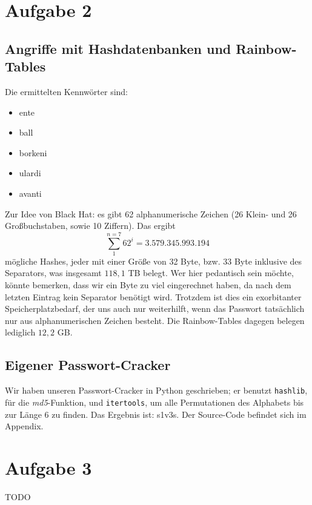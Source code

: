 \documentclass[12pt,a4paper]{article}
\begin{document}
\setcounter{section}{2}
\setcounter{subsection}{0}
\section*{Aufgabe 2}
\subsection{Angriffe mit Hashdatenbanken und Rainbow-Tables}
Die ermittelten Kennwörter sind:
\begin{itemize}
\item ente
\item ball
\item borkeni
\item ulardi
\item avanti
\end{itemize}
Zur Idee von Black Hat:
es gibt 62 alphanumerische Zeichen (26 Klein- und 26 Großbuchstaben, sowie 10 Ziffern).
Das ergibt $$ \sum_1^{n=7} 62^i = 3.579.345.993.194 $$ mögliche Hashes, jeder mit einer
Größe von 32 Byte, bzw. 33 Byte inklusive des Separators, was insgesamt $118,1$ TB belegt.
Wer hier pedantisch sein möchte, könnte bemerken, dass wir ein Byte zu viel eingerechnet
haben, da nach dem letzten Eintrag kein Separator benötigt wird. Trotzdem ist dies ein
exorbitanter Speicherplatzbedarf, der uns auch nur weiterhilft, wenn das Passwort
tatsächlich nur aus alphanumerischen Zeichen besteht. Die Rainbow-Tables dagegen belegen
lediglich $12,2$ GB.

\subsection{Eigener Passwort-Cracker}
Wir haben unseren Passwort-Cracker in Python geschrieben; er benutzt \texttt{hashlib},
für die \textit{md5}-Funktion, und \texttt{itertools}, um alle Permutationen
des Alphabets bis zur Länge 6 zu finden.
Das Ergebnis ist: s1v3s.
Der Source-Code befindet sich im Appendix.


\setcounter{section}{3}
\setcounter{subsection}{0}
\section*{Aufgabe 3}

TODO
\end{document}
